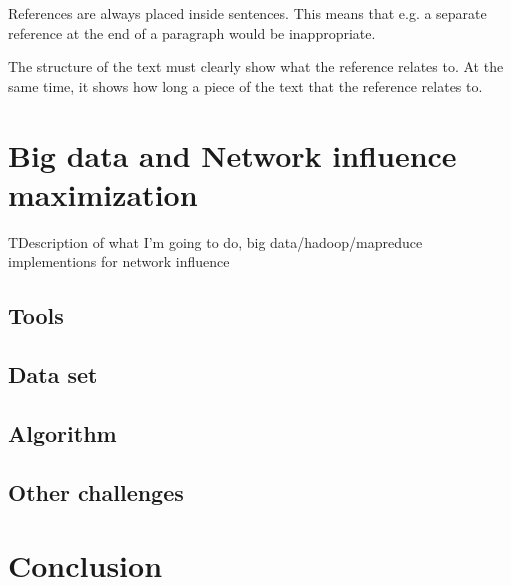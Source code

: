 \documentclass[english]{tktltiki}
\begin{document}
References are always placed inside sentences.  This means that e.g. a separate reference at the end of a paragraph would be inappropriate.

The structure of the text must clearly show what the reference relates to.  At the same time, it 
shows how long a piece of the text that the reference relates to.


\section{Big data and Network influence maximization}

TDescription of what I'm going to do, big data/hadoop/mapreduce implementions for network influence


\subsection{Tools}




\subsection{Data set}





\subsection{Algorithm}



\subsection{Other challenges}



\section{Conclusion}



\nocite{*}




\lastpage

\appendices

\pagestyle{empty}
\end{document}
